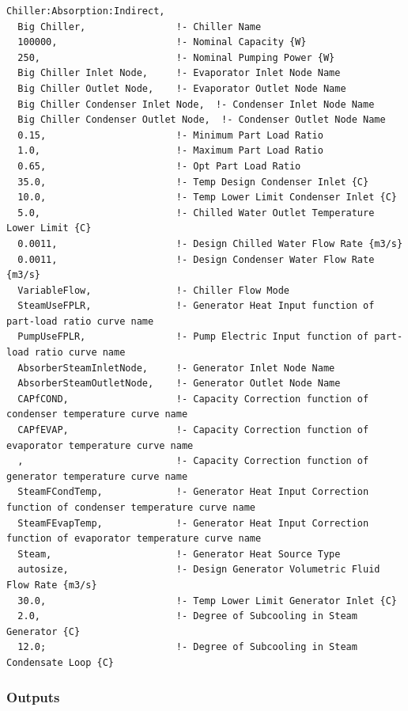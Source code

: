 \begin{lstlisting}
Chiller:Absorption:Indirect,
  Big Chiller,                !- Chiller Name
  100000,                     !- Nominal Capacity {W}
  250,                        !- Nominal Pumping Power {W}
  Big Chiller Inlet Node,     !- Evaporator Inlet Node Name
  Big Chiller Outlet Node,    !- Evaporator Outlet Node Name
  Big Chiller Condenser Inlet Node,  !- Condenser Inlet Node Name
  Big Chiller Condenser Outlet Node,  !- Condenser Outlet Node Name
  0.15,                       !- Minimum Part Load Ratio
  1.0,                        !- Maximum Part Load Ratio
  0.65,                       !- Opt Part Load Ratio
  35.0,                       !- Temp Design Condenser Inlet {C}
  10.0,                       !- Temp Lower Limit Condenser Inlet {C}
  5.0,                        !- Chilled Water Outlet Temperature Lower Limit {C}
  0.0011,                     !- Design Chilled Water Flow Rate {m3/s}
  0.0011,                     !- Design Condenser Water Flow Rate {m3/s}
  VariableFlow,               !- Chiller Flow Mode
  SteamUseFPLR,               !- Generator Heat Input function of part-load ratio curve name
  PumpUseFPLR,                !- Pump Electric Input function of part-load ratio curve name
  AbsorberSteamInletNode,     !- Generator Inlet Node Name
  AbsorberSteamOutletNode,    !- Generator Outlet Node Name
  CAPfCOND,                   !- Capacity Correction function of condenser temperature curve name
  CAPfEVAP,                   !- Capacity Correction function of evaporator temperature curve name
  ,                           !- Capacity Correction function of generator temperature curve name
  SteamFCondTemp,             !- Generator Heat Input Correction function of condenser temperature curve name
  SteamFEvapTemp,             !- Generator Heat Input Correction function of evaporator temperature curve name
  Steam,                      !- Generator Heat Source Type
  autosize,                   !- Design Generator Volumetric Fluid Flow Rate {m3/s}
  30.0,                       !- Temp Lower Limit Generator Inlet {C}
  2.0,                        !- Degree of Subcooling in Steam Generator {C}
  12.0;                       !- Degree of Subcooling in Steam Condensate Loop {C}
\end{lstlisting}

\subsubsection{Outputs}\label{outputs-1-019}

